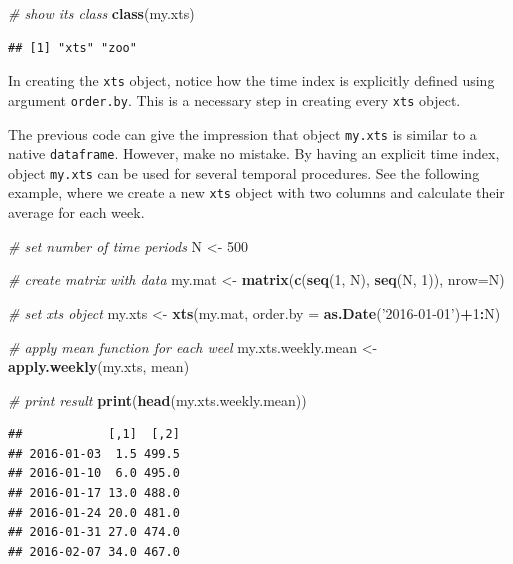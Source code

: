 \documentclass[11pt,]{book}
\newenvironment{Shaded}{\begin{snugshade}}{\end{snugshade}}
\newcommand{\KeywordTok}[1]{\textcolor[rgb]{0.27,0.27,0.27}{\textbf{#1}}}
\newcommand{\DataTypeTok}[1]{\textcolor[rgb]{0.27,0.27,0.27}{#1}}
\newcommand{\DecValTok}[1]{\textcolor[rgb]{0.06,0.06,0.06}{#1}}
\newcommand{\StringTok}[1]{\textcolor[rgb]{0.5,0.5,0.5}{#1}}
\newcommand{\CommentTok}[1]{\textcolor[rgb]{0.56,0.35,0.01}{\textit{#1}}}
\newcommand{\OperatorTok}[1]{\textcolor[rgb]{0.81,0.36,0.00}{\textbf{#1}}}
\newcommand{\NormalTok}[1]{#1}
\begin{document}
\begin{Shaded}
\begin{Highlighting}[]
\CommentTok{# show its class}
\KeywordTok{class}\NormalTok{(my.xts)}
\end{Highlighting}
\end{Shaded}

\begin{verbatim}
## [1] "xts" "zoo"
\end{verbatim}

In creating the \texttt{xts} object, notice how the time index is
explicitly defined using argument \texttt{order.by}. This is a necessary
step in creating every \texttt{xts} object.

The previous code can give the impression that object \texttt{my.xts} is
similar to a native \texttt{dataframe}. However, make no mistake. By
having an explicit time index, object \texttt{my.xts} can be used for
several temporal procedures. See the following example, where we create
a new \texttt{xts} object with two columns and calculate their average
for each week.

\begin{Shaded}
\begin{Highlighting}[]
\CommentTok{# set number of time periods}
\NormalTok{N <-}\StringTok{ }\DecValTok{500}

\CommentTok{# create matrix with data}
\NormalTok{my.mat <-}\StringTok{ }\KeywordTok{matrix}\NormalTok{(}\KeywordTok{c}\NormalTok{(}\KeywordTok{seq}\NormalTok{(}\DecValTok{1}\NormalTok{, N), }\KeywordTok{seq}\NormalTok{(N, }\DecValTok{1}\NormalTok{)), }\DataTypeTok{nrow=}\NormalTok{N)}

\CommentTok{# set xts object}
\NormalTok{my.xts <-}\StringTok{ }\KeywordTok{xts}\NormalTok{(my.mat, }\DataTypeTok{order.by =} \KeywordTok{as.Date}\NormalTok{(}\StringTok{'2016-01-01'}\NormalTok{)}\OperatorTok{+}\DecValTok{1}\OperatorTok{:}\NormalTok{N)}

\CommentTok{# apply mean function for each weel}
\NormalTok{my.xts.weekly.mean <-}\StringTok{ }\KeywordTok{apply.weekly}\NormalTok{(my.xts, mean)}

\CommentTok{# print result}
\KeywordTok{print}\NormalTok{(}\KeywordTok{head}\NormalTok{(my.xts.weekly.mean))}
\end{Highlighting}
\end{Shaded}

\begin{verbatim}
##            [,1]  [,2]
## 2016-01-03  1.5 499.5
## 2016-01-10  6.0 495.0
## 2016-01-17 13.0 488.0
## 2016-01-24 20.0 481.0
## 2016-01-31 27.0 474.0
## 2016-02-07 34.0 467.0
\end{verbatim}
\end{document}
